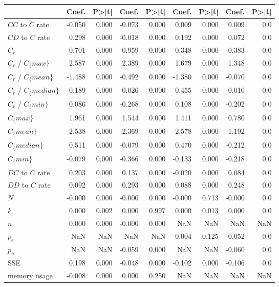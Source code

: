 \begin{tabular}{lrrrrrrrr}
\toprule
{} &  Coef. &  P>|t| &  Coef. &  P>|t| &  Coef. &  P>|t| &  Coef. &  P>|t| \\
\midrule
$CC$ to $C$ rate     & -0.050 &  0.000 & -0.073 &  0.000 &  0.009 &  0.000 &  0.009 &    0.0 \\
$CD$ to $C$ rate     &  0.298 &  0.000 & -0.018 &  0.000 &  0.192 &  0.000 &  0.072 &    0.0 \\
$C_r$                & -0.701 &  0.000 & -0.959 &  0.000 &  0.348 &  0.000 & -0.383 &    0.0 \\
$C_r$ / $C_\{max\}$    &  2.587 &  0.000 &  2.389 &  0.000 &  1.679 &  0.000 &  1.348 &    0.0 \\
$C_r$ / $C_\{mean\}$   & -1.488 &  0.000 & -0.492 &  0.000 & -1.380 &  0.000 & -0.070 &    0.0 \\
$C_r$ / $C_\{median\}$ & -0.189 &  0.000 &  0.026 &  0.000 &  0.455 &  0.000 & -0.010 &    0.0 \\
$C_r$ / $C_\{min\}$    &  0.086 &  0.000 & -0.268 &  0.000 &  0.108 &  0.000 & -0.202 &    0.0 \\
$C_\{max\}$            &  1.961 &  0.000 &  1.544 &  0.000 &  1.411 &  0.000 &  0.780 &    0.0 \\
$C_\{mean\}$           & -2.538 &  0.000 & -2.369 &  0.000 & -2.578 &  0.000 & -1.192 &    0.0 \\
$C_\{median\}$         &  0.511 &  0.000 & -0.079 &  0.000 &  0.470 &  0.000 & -0.212 &    0.0 \\
$C_\{min\}$            & -0.079 &  0.000 & -0.366 &  0.000 & -0.133 &  0.000 & -0.218 &    0.0 \\
$DC$ to $C$ rate     &  0.203 &  0.000 &  0.137 &  0.000 & -0.020 &  0.000 &  0.084 &    0.0 \\
$DD$ to $C$ rate     &  0.092 &  0.000 &  0.293 &  0.000 &  0.088 &  0.000 &  0.248 &    0.0 \\
$N$                  & -0.000 &  0.000 & -0.000 &  0.000 & -0.000 &  0.713 & -0.000 &    0.0 \\
$k$                  &  0.000 &  0.002 &  0.000 &  0.997 &  0.000 &  0.013 &  0.000 &    0.0 \\
$n$                  &  0.000 &  0.000 & -0.000 &  0.000 &    NaN &    NaN &    NaN &    NaN \\
$p_e$                &    NaN &    NaN &    NaN &    NaN &  0.004 &  0.125 & -0.052 &    0.0 \\
$p_n$                &    NaN &    NaN & -0.059 &  0.000 &    NaN &    NaN & -0.060 &    0.0 \\
SSE                  &  0.198 &  0.000 & -0.048 &  0.000 & -0.102 &  0.000 & -0.106 &    0.0 \\
memory usage         & -0.008 &  0.000 &  0.000 &  0.250 &    NaN &    NaN &    NaN &    NaN \\
\bottomrule
\end{tabular}
